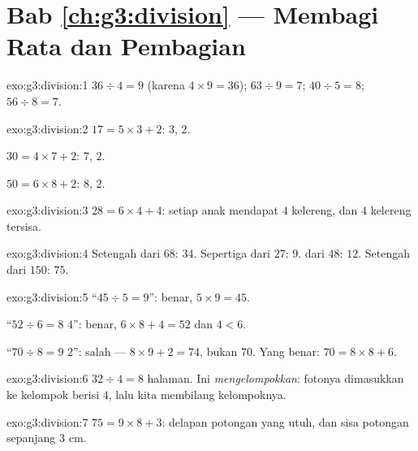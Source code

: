 \section*{Bab \ref{ch:g3:division} --- Membagi Rata dan Pembagian}

\begin{solution}{exo:g3:division:1}
$36 \div 4 = 9$ (karena $4 \times 9 = 36$); \quad
$63 \div 9 = 7$; \quad $40 \div 5 = 8$; \quad $56 \div 8 = 7$.
\end{solution}

\begin{solution}{exo:g3:division:2}
$17 = 5 \times 3 + 2$:  $3$,  $2$.

$30 = 4 \times 7 + 2$:  $7$,  $2$.

$50 = 6 \times 8 + 2$:  $8$,  $2$.
\end{solution}

\begin{solution}{exo:g3:division:3}
$28 = 6 \times 4 + 4$: setiap anak mendapat $4$ kelereng, dan $4$
kelereng tersisa.
\end{solution}

\begin{solution}{exo:g3:division:4}
Setengah dari $68$: $34$. Sepertiga dari $27$: $9$.  dari
$48$: $12$. Setengah dari $150$: $75$.
\end{solution}

\begin{solution}{exo:g3:division:5}
``$45 \div 5 = 9$'': benar, $5 \times 9 = 45$.

``$52 \div 6 = 8$  $4$'': benar, $6 \times 8 + 4 = 52$ dan
$4 < 6$.

``$70 \div 8 = 9$  $2$'': salah --- $8 \times 9 + 2 = 74$,
bukan $70$. Yang benar: $70 = 8 \times 8 + 6$.
\end{solution}

\begin{solution}{exo:g3:division:6}
$32 \div 4 = 8$ halaman. Ini \emph{mengelompokkan}: fotonya
dimasukkan ke kelompok berisi $4$, lalu kita membilang kelompoknya.
\end{solution}

\begin{solution}{exo:g3:division:7}
$75 = 9 \times 8 + 3$: delapan potongan yang utuh, dan sisa potongan
sepanjang $3$ cm.
\end{solution}

